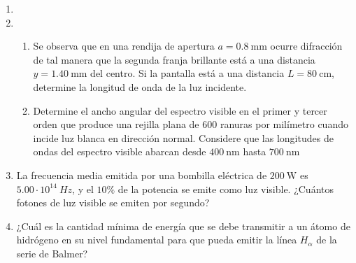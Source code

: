 \documentclass[letterpaper,11pt]{article}
\begin{document}
\vspace{-1cm}
\begin{enumerate}\setlength{\itemsep}{0.4cm}

\item[]



\item 
\begin{enumerate}
    \item Se observa que en una rendija de apertura $a=\SI{0.8}{\mm}$ ocurre difracción de tal manera que la segunda franja brillante está a una distancia $y=\SI{1.40}{\mm}$ del centro. Si la pantalla está a una distancia $L=\SI{80}{\cm}$, determine la longitud de onda de la luz incidente.

    \item Determine el ancho angular del espectro visible en el primer y tercer orden  que produce una rejilla plana de $600$ ranuras por milímetro cuando incide luz blanca en dirección normal. Considere que las longitudes de ondas del espectro visible abarcan desde $\SI{400}{\nm}$ hasta $\SI{700}{\nm}$
\end{enumerate}

\item La frecuencia media emitida por una bombilla eléctrica de $\SI{200}{\W}$ es $5.00\cdot 10^{14}\SI{}{Hz}$, y el $10\%$ de la potencia se emite como luz visible. ¿Cuántos fotones de luz visible se emiten por segundo?

\item ¿Cuál es la cantidad mínima de energía que se debe transmitir a un átomo de hidrógeno en su nivel fundamental para que pueda emitir la línea $H_{\alpha}$ de la serie de Balmer?



\end{enumerate}
\end{document}
